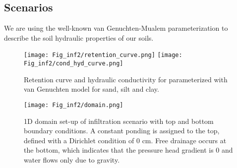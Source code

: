 \newpage
\subsection{Scenarios}

We are using the well-known van Genuchten-Mualem parameterization to describe the soil hydraulic properties of our soils. 

\begin{table}[!h]
\centering
\caption{\label{tab_heat}Material properties needed for scenarios.}
\end{table}
\begin{figure}[!h]

\texttt{[image: Fig\_inf2/retention\_curve.png]}
\texttt{[image: Fig\_inf2/cond\_hyd\_curve.png]}
\caption{Retention curve and hydraulic conductivity for parameterized with van Genuchten model for sand, silt and clay.}
\end{figure}

\begin{figure}[!h]
\centering
\texttt{[image: Fig\_inf2/domain.png]}
\caption{1D domain set-up of infiltration scenario with top and bottom boundary conditions. A constant ponding is assigned to the top, defined with a Dirichlet condition of 0 cm. Free drainage occurs at the bottom, which indicates that the pressure head gradient is 0 and water flows only due to gravity.}
\end{figure}

